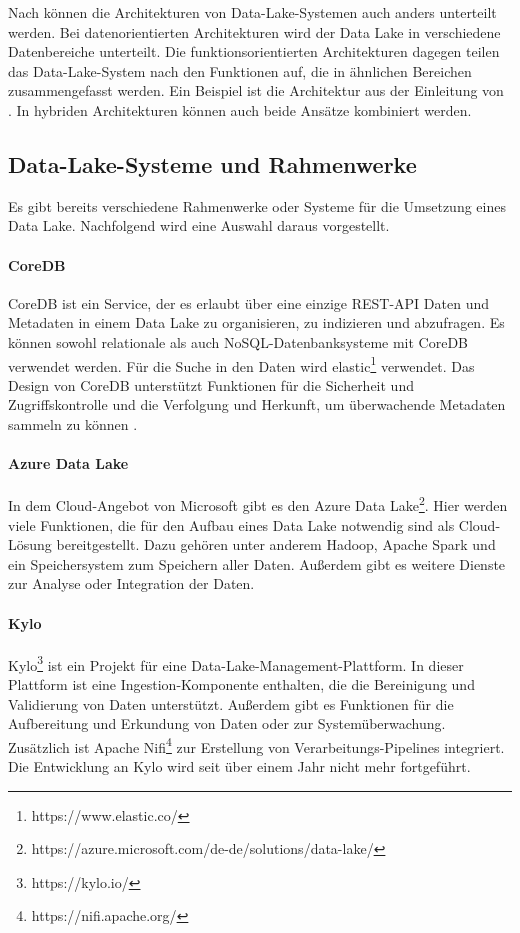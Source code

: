 Nach \textcite{sawadogo2021data} können die Architekturen von Data-Lake-Systemen auch anders unterteilt werden.
Bei datenorientierten Architekturen wird der Data Lake in verschiedene Datenbereiche unterteilt.
Die funktionsorientierten Architekturen dagegen teilen das Data-Lake-System nach den Funktionen auf, die in ähnlichen Bereichen zusammengefasst werden.
Ein Beispiel ist die Architektur aus der Einleitung von \textcite{datalake_03}.
In hybriden Architekturen können auch beide Ansätze kombiniert werden.

\subsection{Data-Lake-Systeme und Rahmenwerke}
Es gibt bereits verschiedene Rahmenwerke oder Systeme für die Umsetzung eines Data Lake.
Nachfolgend wird eine Auswahl daraus vorgestellt.

\paragraph{CoreDB} CoreDB ist ein Service, der es erlaubt über eine einzige REST-API Daten und Metadaten in einem Data Lake zu organisieren, zu indizieren und abzufragen.
Es können sowohl relationale als auch NoSQL-Datenbanksysteme mit CoreDB verwendet werden.
Für die Suche in den Daten wird elastic\footnote{https://www.elastic.co/} verwendet.
Das Design von CoreDB unterstützt Funktionen für die Sicherheit und Zugriffskontrolle und die Verfolgung und Herkunft, um überwachende Metadaten sammeln zu können \parencite{coredb}.

\paragraph{Azure Data Lake} In dem Cloud-Angebot von Microsoft gibt es den Azure Data Lake\footnote{https://azure.microsoft.com/de-de/solutions/data-lake/}.
Hier werden viele Funktionen, die für den Aufbau eines Data Lake notwendig sind als Cloud-Lösung bereitgestellt.
Dazu gehören unter anderem Hadoop, Apache Spark und ein Speichersystem zum Speichern aller Daten.
Außerdem gibt es weitere Dienste zur Analyse oder Integration der Daten.

\paragraph{Kylo} Kylo\footnote{https://kylo.io/} ist ein Projekt für eine Data-Lake-Management-Plattform.
In dieser Plattform ist eine Ingestion-Komponente enthalten, die die Bereinigung und Validierung von Daten unterstützt.
Außerdem gibt es Funktionen für die Aufbereitung und Erkundung von Daten oder zur Systemüberwachung.
Zusätzlich ist Apache Nifi\footnote{https://nifi.apache.org/} zur Erstellung von Verarbeitungs-Pipelines integriert.
Die Entwicklung an Kylo wird seit über einem Jahr nicht mehr fortgeführt.

